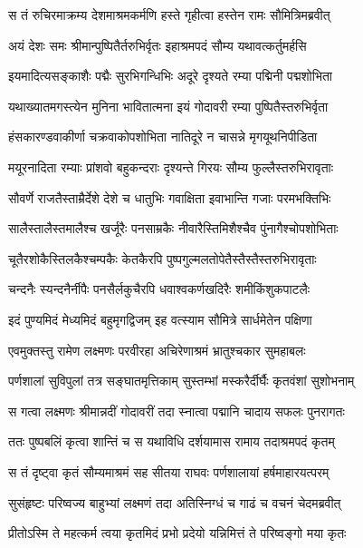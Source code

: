 \twolineshloka
{स तं रुचिरमाक्रम्य देशमाश्रमकर्मणि}
{हस्ते गृहीत्वा हस्तेन रामः सौमित्रिमब्रवीत्} %

\twolineshloka
{अयं देशः समः श्रीमान्पुष्पितैर्तरुभिर्वृतः}
{इहाश्रमपदं सौम्य यथावत्कर्तुमर्हसि} %

\twolineshloka
{इयमादित्यसङ्काशैः पद्मैः सुरभिगन्धिभिः}
{अदूरे दृश्यते रम्या पद्मिनी पद्मशोभिता} %

\twolineshloka
{यथाख्यातमगस्त्येन मुनिना भावितात्मना}
{इयं गोदावरी रम्या पुष्पितैस्तरुभिर्वृता} %

\twolineshloka
{हंसकारण्डवाकीर्णा चक्रवाकोपशोभिता}
{नातिदूरे न चासन्ने मृगयूथनिपीडिता} %

\twolineshloka
{मयूरनादिता रम्याः प्रांशवो बहुकन्दराः}
{दृश्यन्ते गिरयः सौम्य फुल्लैस्तरुभिरावृताः} %

\twolineshloka
{सौवर्णे राजतैस्ताम्रैर्देशे देशे च धातुभिः}
{गवाक्षिता इवाभान्ति गजाः परमभक्तिभिः} %

\twolineshloka
{सालैस्तालैस्तमालैश्च खर्जूरैः पनसाम्रकैः}
{नीवारैस्तिमिशैश्चैव पुंनागैश्चोपशोभिताः} %

\twolineshloka
{चूतैरशोकैस्तिलकैश्चम्पकैः केतकैरपि}
{पुष्पगुल्मलतोपेतैस्तैस्तैस्तरुभिरावृताः} %

\twolineshloka
{चन्दनैः स्यन्दनैर्नीपैः पनसैर्लकुचैरपि}
{धवाश्वकर्णखदिरैः शमीकिंशुकपाटलैः} %

\twolineshloka
{इदं पुण्यमिदं मेध्यमिदं बहुमृगद्विजम्}
{इह वत्स्याम सौमित्रे सार्धमेतेन पक्षिणा} %

\twolineshloka
{एवमुक्तस्तु रामेण लक्ष्मणः परवीरहा}
{अचिरेणाश्रमं भ्रातुश्चकार सुमहाबलः} %

\twolineshloka
{पर्णशालां सुविपुलां तत्र सङ्घातमृत्तिकाम्}
{सुस्तम्भां मस्करैर्दीर्घैः कृतवंशां सुशोभनाम्} %

\twolineshloka
{स गत्वा लक्ष्मणः श्रीमान्नदीं गोदावरीं तदा}
{स्नात्वा पद्मानि चादाय सफलः पुनरागतः} %

\twolineshloka
{ततः पुष्पबलिं कृत्वा शान्तिं च स यथाविधि}
{दर्शयामास रामाय तदाश्रमपदं कृतम्} %

\twolineshloka
{स तं दृष्ट्वा कृतं सौम्यमाश्रमं सह सीतया}
{राघवः पर्णशालायां हर्षमाहारयत्परम्} %

\twolineshloka
{सुसंहृष्टः परिष्वज्य बाहुभ्यां लक्ष्मणं तदा}
{अतिस्निग्धं च गाढं च वचनं चेदमब्रवीत्} %

\twolineshloka
{प्रीतोऽस्मि ते महत्कर्म त्वया कृतमिदं प्रभो}
{प्रदेयो यन्निमित्तं ते परिष्वङ्गो मया कृतः} %

